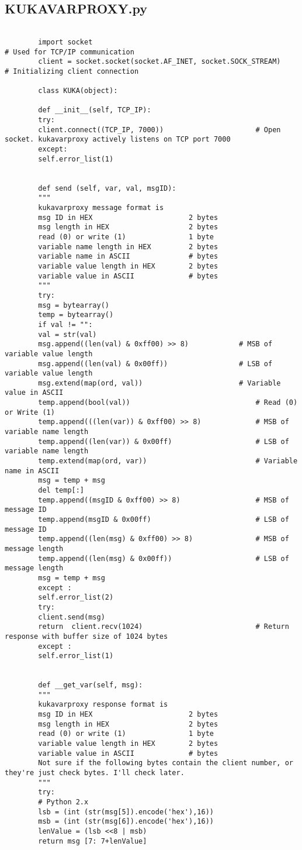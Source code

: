 \documentclass{book}
\begin{document}
		\subsection{KUKAVARPROXY.py}
		\begin{verbatim}
		
		import socket                                                   # Used for TCP/IP communication
		client = socket.socket(socket.AF_INET, socket.SOCK_STREAM)		# Initializing client connection
		
		class KUKA(object):
		
		def __init__(self, TCP_IP):
		try: 
		client.connect((TCP_IP, 7000))                      # Open socket. kukavarproxy actively listens on TCP port 7000
		except: 
		self.error_list(1)
		
		
		def send (self, var, val, msgID):
		"""
		kukavarproxy message format is 
		msg ID in HEX                       2 bytes
		msg length in HEX                   2 bytes
		read (0) or write (1)               1 byte
		variable name length in HEX         2 bytes
		variable name in ASCII              # bytes
		variable value length in HEX        2 bytes
		variable value in ASCII             # bytes
		"""
		try:
		msg = bytearray()
		temp = bytearray()
		if val != "":
		val = str(val)
		msg.append((len(val) & 0xff00) >> 8)            # MSB of variable value length
		msg.append((len(val) & 0x00ff))                 # LSB of variable value length
		msg.extend(map(ord, val))                       # Variable value in ASCII
		temp.append(bool(val))                              # Read (0) or Write (1)
		temp.append(((len(var)) & 0xff00) >> 8)             # MSB of variable name length
		temp.append((len(var)) & 0x00ff)                    # LSB of variable name length
		temp.extend(map(ord, var))                          # Variable name in ASCII 
		msg = temp + msg
		del temp[:]
		temp.append((msgID & 0xff00) >> 8)                  # MSB of message ID
		temp.append(msgID & 0x00ff)                         # LSB of message ID
		temp.append((len(msg) & 0xff00) >> 8)               # MSB of message length
		temp.append((len(msg) & 0x00ff))                    # LSB of message length
		msg = temp + msg
		except :
		self.error_list(2)
		try:
		client.send(msg)
		return  client.recv(1024)                           # Return response with buffer size of 1024 bytes
		except :
		self.error_list(1)
		
		
		def __get_var(self, msg):
		"""
		kukavarproxy response format is 
		msg ID in HEX                       2 bytes
		msg length in HEX                   2 bytes
		read (0) or write (1)               1 byte
		variable value length in HEX        2 bytes
		variable value in ASCII             # bytes
		Not sure if the following bytes contain the client number, or they're just check bytes. I'll check later.
		"""
		try:
		# Python 2.x
		lsb = (int (str(msg[5]).encode('hex'),16))
		msb = (int (str(msg[6]).encode('hex'),16))
		lenValue = (lsb <<8 | msb)
		return msg [7: 7+lenValue]
		

\end{verbatim}
\end{document}
